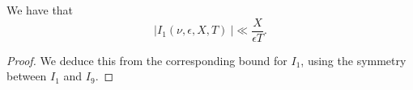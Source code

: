 \begin{lemma}[I9Bound]
\label{I9Bound}
\leanok
We have that
  $$
  \left|I_{1}(\nu, \epsilon, X, T)\
  \right| \ll \frac{X}{\epsilon T}
  .
  $$
\end{lemma}
\begin{proof}
\leanok
We deduce this from the corresponding bound for $I_1$, using the symmetry between $I_1$ and $I_9$.
\end{proof}
